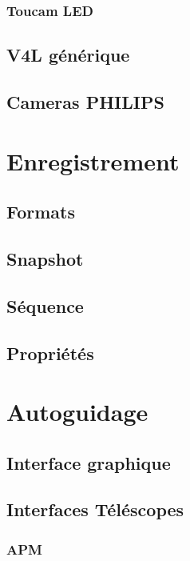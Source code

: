 \documentclass[11pt,a4paper]{book}
\begin{document}
\subsection{Toucam LED}

\section{V4L g\'en\'erique}

\section{Cameras PHILIPS}

\chapter{Enregistrement}

\section{Formats}

\section{Snapshot}

\section{S\'equence}

\section{Propri\'et\'es}

\chapter{Autoguidage}

\section{Interface graphique}

\section{Interfaces T\'el\'escopes}

\subsection{APM}
\end{document}
